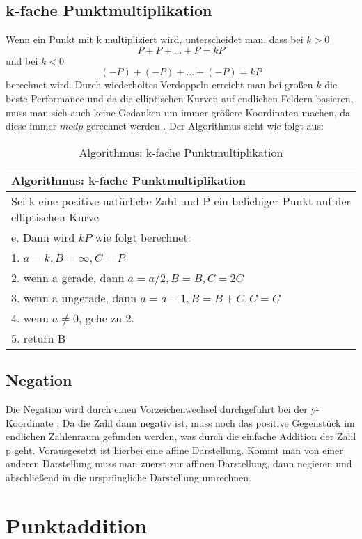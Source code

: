 \subsection{k-fache Punktmultiplikation}
Wenn ein Punkt mit k multipliziert wird, unterscheidet man, dass bei \(k > 0\) \[P + P + ... + P = kP\] und bei \(k < 0\) \[ (-P) + (-P) + ... + (-P) = kP\] berechnet wird. Durch wiederholtes Verdoppeln erreicht man bei großen \(k\) die beste Performance und da die elliptischen Kurven auf endlichen Feldern basieren, muss man sich auch keine Gedanken um immer größere Koordinaten machen, da diese immer \( mod p\) gerechnet werden \cite{Washington2003}. Der Algorithmus sieht wie folgt aus:

\begin{table}[!ht]
\centering
	\begin{tabular}{l}
		\toprule
		\textbf{Algorithmus: k-fache Punktmultiplikation}\\
		\midrule
		Sei k eine positive natürliche Zahl und P ein beliebiger Punkt auf der elliptischen Kurve\\ e. Dann wird \(kP\) wie folgt berechnet:\\
		1. \(a = k , B = \infty , C = P\)\\
		2. wenn a gerade, dann \(a = a/2 , B = B , C = 2C\)\\
		3. wenn a ungerade, dann \(a = a - 1 , B = B + C , C = C\)\\
		4. wenn \( a \neq 0\), gehe zu 2.\\
		5. return B\\
	   \bottomrule
	\end{tabular}
	\caption{Algorithmus: k-fache Punktmultiplikation \cite{Washington2003}}
	\label{tab6}
\end{table}


\subsection{Negation}
Die Negation wird durch einen Vorzeichenwechsel durchgeführt bei der y-Koordinate \cite{Washington2003}. Da die Zahl dann negativ ist, muss noch das positive Gegenstück im endlichen Zahlenraum gefunden werden, was durch die einfache Addition der Zahl p geht. Vorausgesetzt ist hierbei eine affine Darstellung. Kommt man von einer anderen Darstellung muss man zuerst zur affinen Darstellung, dann negieren und abschließend in die ursprüngliche Darstellung umrechnen.

\section{Punktaddition}
